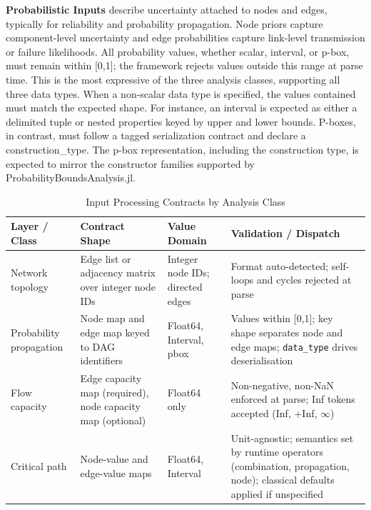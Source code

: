 \documentclass[12pt]{report}
\begin{document}
\textbf{Probabilistic Inputs} describe uncertainty attached to nodes and edges, typically for reliability and probability propagation. Node priors capture component-level uncertainty and edge probabilities capture link-level transmission or failure likelihoods. All probability values, whether scalar, interval, or p-box, must remain within [0,1]; the framework rejects values outside this range at parse time. This is the most expressive of the three analysis classes, supporting all three data types. When a non-scalar data type is specified, the values contained must match the expected shape. For instance, an interval is expected as either a delimited tuple or nested properties keyed by upper and lower bounds. P-boxes, in contrast, must follow a tagged serialization contract and declare a construction\_type. The p-box representation, including the construction type, is expected to mirror the constructor families supported by ProbabilityBoundsAnalysis.jl.

\begin{table}[htbp]
\centering
\caption{Input Processing Contracts by Analysis Class}
\label{tab:input-processing-contracts}
\small
\renewcommand{\arraystretch}{1.15}
\begin{tabular}{|p{}|p{}|p{}|p{}|}
\hline
\textbf{Layer / Class} & \textbf{Contract Shape} & \textbf{Value Domain} & \textbf{Validation / Dispatch} \\
\hline
Network topology
& Edge list or adjacency matrix over integer node IDs
& Integer node IDs; directed edges
& Format auto-detected; self-loops and cycles rejected at parse \\
\hline
Probability propagation
& Node map and edge map keyed to DAG identifiers
& Float64, Interval, pbox
& Values within [0,1]; key shape separates node and edge maps; \texttt{data\_type} drives deserialisation \\
\hline
Flow capacity
& Edge capacity map (required), node capacity map (optional)
& Float64 only
& Non-negative, non-NaN enforced at parse; Inf tokens accepted (Inf, +Inf, $\infty$) \\
\hline
Critical path
& Node-value and edge-value maps
& Float64, Interval
& Unit-agnostic; semantics set by runtime operators (combination, propagation, node); classical defaults applied if unspecified \\
\hline
\end{tabular}
\end{table}
\end{document}
